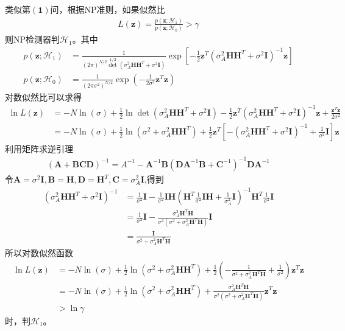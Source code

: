\documentclass[fontset=windows]{article}
\numberwithin{figure}{section}
\begin{document}
类似第\(\mathbf{(1)}\)问，根据NP准则，如果似然比
\begin{align*}
	L(\mathbf{z})=\frac{p(\mathbf{z};\mathcal{H}_1)}{p(\mathbf{z};\mathcal{H}_0)}>\gamma
\end{align*}
则NP检测器判\(\mathcal{H}_1\)。其中
\begin{align*}
	p(\mathbf{z};\mathcal{H}_1)
	 & =\frac{1}{(2\pi)^{N/2} \det^{1/2}(\sigma^2_A\mathbf{HH}^T+\sigma^2\mathbf{I})}
	\exp\left[-\frac{1}{2}\mathbf{z}^T(\sigma^2_A\mathbf{HH}^T+\sigma^2\mathbf{I})^{-1}\mathbf{z} \right] \\
	p(\mathbf{z};\mathcal{H}_0)
	 & =\frac{1}{(2\pi\sigma^2)^{N/2}}\exp
	\left(-\frac{1}{2\sigma^2}\mathbf{z}^T\mathbf{z} \right)
\end{align*}
对数似然比可以求得
\begin{align*}
	\ln L(\mathbf{z})
	 & =-N\ln(\sigma)+\frac{1}{2}\ln \det(\sigma^2_A\mathbf{HH}^T+\sigma^2\mathbf{I})
	-\frac{1}{2}\mathbf{z}^T(\sigma^2_A\mathbf{HH}^T+\sigma^2\mathbf{I})^{-1}\mathbf{z}
	+\frac{\mathbf{z}^T\mathbf{z}}{{2\sigma^2}}                                       \\
	 & =-N\ln(\sigma)+\frac{1}{2}\ln(\sigma^2+\sigma^2_A\mathbf{HH}^T)
	+\frac{1}{2}\mathbf{z}^T\left[-(\sigma^2_A\mathbf{HH}^T+\sigma^2\mathbf{I})^{-1}+\frac{1}{\sigma^2}\mathbf{I}\right]\mathbf{z}
\end{align*}
利用矩阵求逆引理
\begin{align*}
	(\mathbf{A}+\mathbf{BCD})^{-1}=A^{-1}-\mathbf{A}^{-1}\mathbf{B}(\mathbf{DA}^{-1}\mathbf{B}+\mathbf{C}^{-1})^{-1}\mathbf{DA}^{-1}
\end{align*}
令\(\mathbf{A}=\sigma^2\mathbf{I},\mathbf{B}=\mathbf{H},\mathbf{D}=\mathbf{H}^T,\mathbf{C}=\sigma^2_A\mathbf{I}\),得到
\begin{align*}
	(\sigma^2_A\mathbf{HH}^T+\sigma^2\mathbf{I})^{-1}
	 & =\frac{1}{\sigma^2}\mathbf{I}-
	\frac{1}{\sigma^2}\mathbf{IH}(\mathbf{H}^T\frac{1}{\sigma^2}\mathbf{IH}+\frac{1}{\sigma^2_A}\mathbf{I})^{-1}
	\mathbf{H}^T\frac{1}{\sigma^2}\mathbf{I}                                                                                                \\
	 & =\frac{1}{\sigma^2}\mathbf{I}-\frac{\sigma^2_A\mathbf{H}^T\mathbf{H}}{\sigma^2(\sigma^2+\sigma^2_A\mathbf{H}^T\mathbf{H})}\mathbf{I} \\
	 & =\frac{\mathbf{I}}{\sigma^2+\sigma^2_A\mathbf{H}^T\mathbf{H}}
\end{align*}
所以对数似然函数
\begin{align*}
	\ln L(\mathbf{z})
	 & =-N\ln(\sigma)+\frac{1}{2}\ln(\sigma^2+\sigma^2_A\mathbf{HH}^T)
	+\frac{1}{2}(-\frac{1}{\sigma^2+\sigma^2_A\mathbf{H}^T\mathbf{H}}+\frac{1}{\sigma^2})\mathbf{z}^T\mathbf{z}        \\
	 & =-N\ln(\sigma)+\frac{1}{2}\ln(\sigma^2+\sigma^2_A\mathbf{HH}^T)+
	\frac{\sigma^2_A\mathbf{H}^T\mathbf{H}}{\sigma^2(\sigma^2+\sigma^2_A\mathbf{H}^T\mathbf{H})}\mathbf{z}^T\mathbf{z} \\
	 & >\ln \gamma
\end{align*}
时，判\(\mathcal{H}_1\)。
\end{document}
